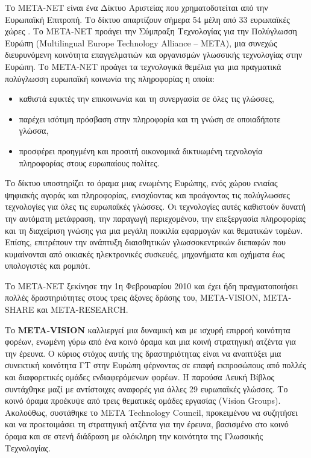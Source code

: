 \begin{multicols}{2}
   Το META-NET είναι ένα Δίκτυο Αριστείας που χρηματοδοτείται από την Ευρωπαϊκή Επιτροπή. Το δίκτυο απαρτίζουν σήμερα 54 μέλη από 33 ευρωπαϊκές χώρες \cite{rehm2011}. Το META-NET προάγει την Σύμπραξη Τεχνολογίας για την Πολύγλωσση Ευρώπη (Multilingual Europe Technology Alliance -- META), μια συνεχώς διευρυνόμενη κοινότητα επαγγελματιών και οργανισμών γλωσσικής τεχνολογίας στην Ευρώπη. Το META-NET προάγει τα τεχνολογικά θεμέλια για μια πραγματικά πολύγλωσση ευρωπαϊκή κοινωνία της πληροφορίας η οποία:

\begin{itemize}
\item  καθιστά εφικτές την επικοινωνία και τη συνεργασία σε όλες τις γλώσσες,
\item παρέχει ισότιμη πρόσβαση στην πληροφορία και τη γνώση σε οποιαδήποτε γλώσσα,
\item προσφέρει προηγμένη και προσιτή οικονομικά δικτυωμένη τεχνολογία πληροφορίας στους ευρωπαίους πολίτες.
\end{itemize}

Το δίκτυο υποστηρίζει το  όραμα μιας ενωμένης Ευρώπης, ενός χώρου ενιαίας ψηφιακής αγοράς και πληροφορίας, ενισχύοντας και προάγοντας τις πολύγλωσσες τεχνολογίες για όλες τις ευρωπαϊκές γλώσσες. Οι τεχνολογίες αυτές καθιστούν δυνατή την αυτόματη μετάφραση, την παραγωγή περιεχομένου, την επεξεργασία πληροφορίας και τη διαχείριση γνώσης για μια μεγάλη ποικιλία εφαρμογών και θεματικών τομέων. Επίσης, επιτρέπουν την ανάπτυξη διαισθητικών γλωσσοκεντρικών διεπαφών που κυμαίνονται από οικιακές ηλεκτρονικές συσκευές, μηχανήματα και οχήματα έως υπολογιστές και ρομπότ.

Το META-NET ξεκίνησε την 1η Φεβρουαρίου 2010 και έχει ήδη πραγματοποιήσει πολλές δραστηριότητες στους τρεις άξονες δράσης του, META-VISION, META-SHARE και META-RESEARCH. 

Το \textbf{META-VISION} καλλιεργεί μια δυναμική και με ισχυρή επιρροή κοινότητα φορέων, ενωμένη γύρω από ένα κοινό όραμα και μια κοινή στρατηγική ατζέντα για την έρευνα. Ο κύριος στόχος αυτής της δραστηριότητας είναι να αναπτύξει μια συνεκτική κοινότητα ΓΤ στην Ευρώπη φέρνοντας σε επαφή εκπροσώπους από πολλές και διαφορετικές ομάδες ενδιαφερόμενων φορέων. Η παρούσα Λευκή Βίβλος συντάχθηκε μαζί με αντίστοιχες αναφορές για άλλες 29 ευρωπαϊκές γλώσσες. Το κοινό όραμα προέκυψε από τρεις θεματικές ομάδες εργασίας (Vision Groups). Ακολούθως, συστάθηκε το META Technology Council, προκειμένου να συζητήσει και να προετοιμάσει τη στρατηγική ατζέντα για την έρευνα, βασισμένο στο κοινό όραμα και σε στενή διάδραση με ολόκληρη την κοινότητα της Γλωσσικής Τεχνολογίας.


\end{multicols}
